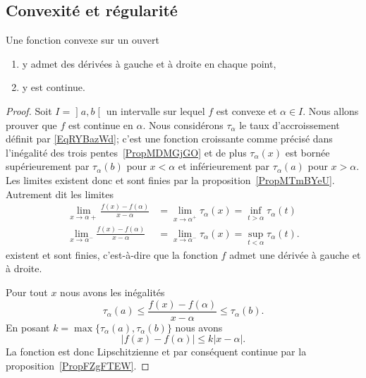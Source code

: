 \subsection{Convexité et régularité}

\begin{lemma}   \label{LemKLTsHIQ}
	Une fonction convexe sur un ouvert
	\begin{enumerate}
		\item
		      y admet des dérivées à gauche et à droite en chaque point,
		\item
		      y est continue.
	\end{enumerate}
\end{lemma}

\begin{proof}
	Soit \( I=\mathopen] a , b \mathclose[\) un intervalle sur lequel \( f\) est convexe et \( \alpha\in I\). Nous allons prouver que \( f\) est continue en \( \alpha\). Nous considérons \( \tau_{\alpha}\) le taux d'accroissement définit par \eqref{EqRYBazWd}; c'est une fonction croissante comme précisé dans l'inégalité des trois pentes~\ref{PropMDMGjGO} et de plus \( \tau_{\alpha}(x)\) est bornée supérieurement par \( \tau_{\alpha}(b)\) pour \( x<\alpha\) et inférieurement par \( \tau_{\alpha}(a)\) pour \( x>\alpha\). Les limites existent donc et sont finies par la proposition~\ref{PropMTmBYeU}. Autrement dit les limites
	\begin{subequations}
		\begin{align}
			\lim_{x\to \alpha+} \frac{ f(x)-f(\alpha) }{ x-\alpha }  & =\lim_{x\to \alpha^+} \tau_{\alpha}(x)=\inf_{t>\alpha}\tau_{\alpha}(t)  \\
			\lim_{x\to \alpha^-} \frac{ f(x)-f(\alpha) }{ x-\alpha } & =\lim_{x\to \alpha^-} \tau_{\alpha}(x)=\sup_{t<\alpha}\tau_{\alpha}(t).
		\end{align}
	\end{subequations}
	existent et sont finies, c'est-à-dire que la fonction \( f\) admet une dérivée à gauche et à droite.

	Pour tout \( x\) nous avons les inégalités
	\begin{equation}
		\tau_{\alpha}(a)\leq \frac{ f(x)-f(\alpha) }{ x-\alpha }\leq \tau_{\alpha}(b).
	\end{equation}
	En posant \( k=\max\{ \tau_{\alpha}(a),\tau_{\alpha}(b) \}\) nous avons
	\begin{equation}
		\big| f(x)-f(\alpha) \big|\leq k| x-\alpha |.
	\end{equation}
	La fonction est donc Lipschitzienne et par conséquent continue par la proposition~\ref{PropFZgFTEW}.
\end{proof}

